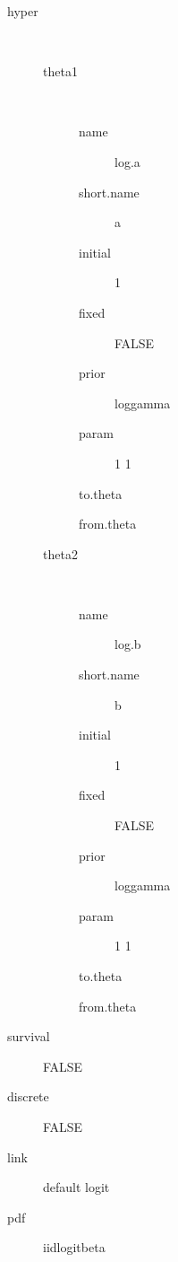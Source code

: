 \begin{description}
	\item[hyper]\ 
	 \begin{description}
	 	\item[theta1]\ 
	 	 \begin{description}
	 	 	 \item[ name ] log.a 
	 	 	 \item[ short.name ] a 
	 	 	 \item[ initial ] 1 
	 	 	 \item[ fixed ] FALSE 
	 	 	 \item[ prior ] loggamma 
	 	 	 \item[ param ] 1 1 
	 	 	 \item[ to.theta ] \verb|| 
	 	 	 \item[ from.theta ] \verb|| 
	 	 \end{description}
	 	\item[theta2]\ 
	 	 \begin{description}
	 	 	 \item[ name ] log.b 
	 	 	 \item[ short.name ] b 
	 	 	 \item[ initial ] 1 
	 	 	 \item[ fixed ] FALSE 
	 	 	 \item[ prior ] loggamma 
	 	 	 \item[ param ] 1 1 
	 	 	 \item[ to.theta ] \verb|| 
	 	 	 \item[ from.theta ] \verb|| 
	 	 \end{description}
	 \end{description}
	 \item[ survival ] FALSE 
	 \item[ discrete ] FALSE 
	 \item[ link ] default logit 
	 \item[ pdf ] iidlogitbeta 
\end{description}
